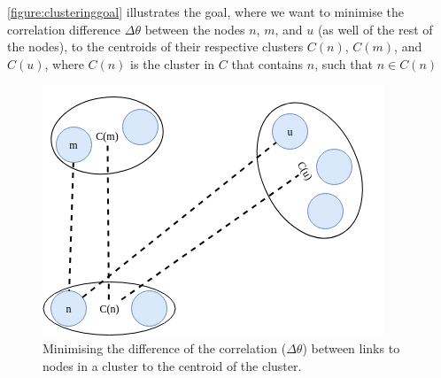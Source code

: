 
\autoref{figure:clusteringgoal} illustrates the goal, where we want to minimise the correlation difference $\Delta\theta$ between the nodes $n$, $m$, and $u$ (as well of the rest of the nodes), to the centroids of their respective clusters $C(n)$, $C(m)$, and $C(u)$, where $C(n)$ is the cluster in $C$ that contains $n$, such that $n \in C(n)$

\begin{figure}[ht]
    \centering
    \includegraphics[width=.5\textwidth]{figures/clustering/clustering.png}
    \caption{Minimising the difference of the correlation ($\Delta\theta$) between links to nodes in a cluster to the centroid of the cluster.}
    \label{figure:clusteringgoal}
\end{figure}





